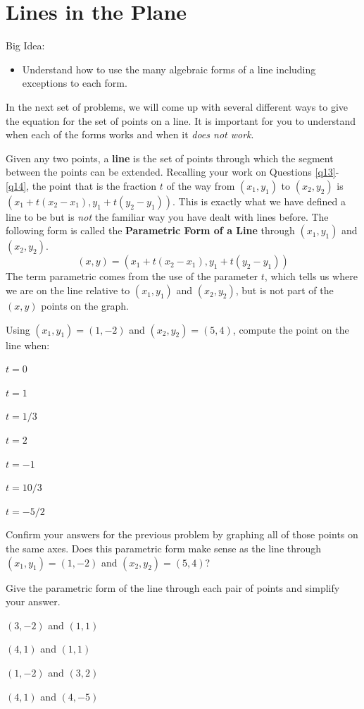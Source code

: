 \section{Lines in the Plane}
Big Idea:
\begin{itemize}
\item Understand how to use the many algebraic forms of a line including exceptions to each form.
\end{itemize}
In the next set of problems, we will come up with several different ways to give the equation for the set of points on a line. It is important for you to understand when each of the forms works and when it \emph{does not work}.
\begin{info} Given any two points, a \textbf{line} is the set of points through which the segment between the points can be extended.
Recalling your work on Questions \ref{q13}-\ref{q14}, the point that is the fraction $t$ of the way from $(x_1,y_1)$ to $(x_2,y_2)$ is $(x_1+t(x_2-x_1),y_1+t(y_2-y_1))$. This is exactly what we have defined a line to be but is \emph{not} the familiar way you have dealt with lines before. The following form is called the \textbf{Parametric Form of a Line} through $(x_1,y_1)$ and $(x_2,y_2)$. $$(x,y)=(x_1+t(x_2-x_1),y_1+t(y_2-y_1))$$
The term parametric comes from the use of the parameter $t$, which tells us where we are on the line relative to $(x_1,y_1)$ and $(x_2,y_2)$, but is not part of the $(x,y)$ points on the graph.
\end{info}

\bq\label{qp} Using $(x_1,y_1)=(1,-2)$ and $(x_2,y_2) = (5,4)$, compute the point on the line when:
\be
\item $t=0$
\item $t=1$
\item $t=1/3$
\item $t=2$
\item $t=-1$
\item $t=10/3$
\item $t=-5/2$
\ee
\eq

\bq Confirm your answers for the previous problem by graphing all of those points on the same axes. Does this parametric form make sense as the line through $(x_1,y_1)=(1,-2)$ and $(x_2,y_2) = (5,4)$?
\eq

\bq Give the parametric form of the line through each pair of points and simplify your answer.
\be
\item $(3,-2)$ and $(1,1)$
\item $(4,1)$ and $(1,1)$
\item $(1,-2)$ and $(3,2)$
\item $(4,1)$ and $(4,-5)$
\ee
\eq

